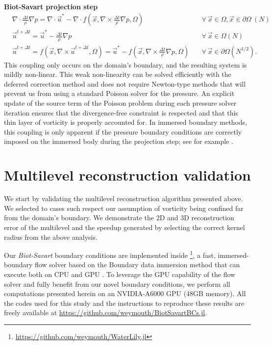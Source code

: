 \documentclass{article}
\begin{document}
\textbf{Biot-Savart projection step}
\begin{align}
    &\nabla\cdot\frac{\Delta t}{\rho}\nabla p = \nabla\cdot \vec{u}^*-\nabla\cdot f(\vec{x},\nabla\times\frac{\Delta t}{\rho}\nabla p,\Omega) &\quad\forall\ \vec{x}\in\Omega, \vec{x}\in\partial\Omega\ (N)\\
    &\vec{u}^{t+\Delta t} = \vec{u}^*-\frac{\Delta t}{\rho}\nabla p &\quad\forall\ \vec{x}\in\Omega (N)\\
    &\vec{u}^{t+\Delta t} = f(\vec{x},\nabla\times \vec{u}^{t+\Delta t},\Omega)= \vec{u}^*-f(\vec{x},\nabla\times\frac{\Delta t}{\rho}\nabla p,\Omega) &\quad\forall\ \vec{x}\in\partial\Omega (N^{1/2}).
\end{align}
This coupling only occurs on the domain's boundary, and the resulting system is mildly non-linear. This weak non-linearity can be solved efficiently with the deferred correction method and does not require Newton-type methods that will prevent us from using a standard Poisson solver for the pressure. An explicit update of the source term of the Poisson problem during each pressure solver iteration ensures that the divergence-free constraint is respected and that this thin layer of vorticity is properly accounted for. In immersed boundary methods, this coupling is only apparent if the pressure boundary conditions are correctly imposed on the immersed body during the projection step; see for example \cite{Taira2007, Lauber2022}.

\section{Multilevel reconstruction validation}

We start by validating the multilevel reconstruction algorithm presented above. We selected to cases such respect our assumption of vorticity being confined far from the domain's boundary. We demonstrate the 2D and 3D reconstruction error of the multilevel and the speedup generated by selecting the correct kernel radius from the above analysis.

Our \emph{Biot-Savart} boundary conditions are implemented inside \textbf{}\footnote{\url{https://github.com/weymouth/WaterLily.jl}}, a fast, immersed-boundary flow solver based on the Boundary data immersion method \cite{Maertens2015} that can execute both on CPU and GPU \cite{Weymouth2023WaterLily.jl:Execution}. To leverage the GPU capability of the flow solver and fully benefit from our novel boundary conditions, we perform all computations presented herein on an NVIDIA-A6000 GPU (48GB memory). All the codes used for this study and the instructions to reproduce these results are freely available at \url{https://github.com/weymouth/BiotSavartBCs.jl}.
\end{document}
